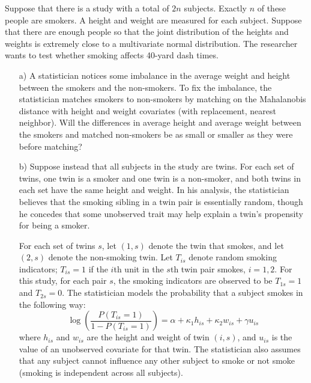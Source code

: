 \documentclass{article}
\begin{document}
  Suppose that there is a study with 
      a total of $2n$ subjects.
      Exactly $n$ of these people are smokers.
      A height and weight are measured for
      each subject.
      Suppose that there are enough people so that
      the joint distribution of the heights and weights is extremely close to a
      multivariate normal distribution.
      The researcher wants to test whether smoking affects 40-yard dash times.
      \begin{itemize}
        \item[a)]
          A statistician notices some imbalance in the average weight and height 
          between the smokers and the non-smokers.         
          To fix the imbalance, the statistician matches smokers
          to non-smokers by matching 
          on the Mahalanobis distance with height and weight covariates          
          (with replacement, nearest neighbor).
          Will the differences in average height and average
          weight between the smokers
          and matched non-smokers            
          be as small or smaller as they were before matching?
        \item[b)]
          Suppose instead that all subjects in the study are twins.
          For each set of twins, one twin is a smoker and one twin is a non-smoker,
          and both twins in each set have the same height and weight.
          In his analysis, the statistician believes that 
          the smoking sibling in a twin pair 
          is essentially random, though he concedes
          that some unobserved trait may help explain a twin's 
          propensity for being a smoker.
           
          For each set of twins $s$, let $(1,s)$ denote the twin that smokes,
          and let $(2,s)$ denote the non-smoking twin.
          Let $T_{is}$ denote random smoking indicators;
          $T_{is} = 1$ if the $i$th unit in the $s$th twin pair smokes, $i = 1,2$.
          For this study, for each pair $s$, 
          the smoking indicators are observed to be $T_{1s} = 1$
          and $T_{2s} = 0$.
          The statistician models the probability that a subject smokes in the following way:
          \begin{equation}
            \log\left( 
              \frac{P(T_{is} = 1)}{1 - P(T_{is} = 1)}
            \right) = \alpha + \kappa_1 h_{is} + \kappa_2 w_{is} + \gamma u_{is}
            \label{probassign}
          \end{equation}
          where $h_{is}$ and $w_{is}$ are the height and weight of twin $(i,s)$,
          and $u_{is}$ is the value of an unobserved covariate for that twin.
          The statistician also assumes that any subject cannot influence
          any other subject to smoke or not smoke
          (smoking is independent across all subjects).
           

\end{itemize}
\end{document}
